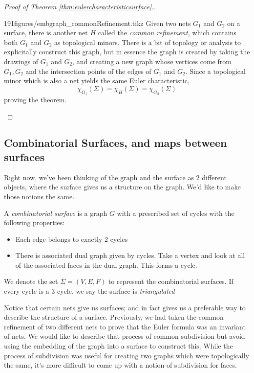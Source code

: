 \begin{proof}[Proof of Theorem \ref{thm:eulercharacteristicsurface}.]
\begin{paragraphfigureenv}{191figures/embgraph_commonRefinement.tikz}
Given two nets $G_1$ and $G_2$ on a surface, there is another net $H$ called the \emph{common refinement,} which contains both $G_1$ and $G_2$ as topological minors. There is a bit of topology or analysis to explicitally construct this graph, but in essence the graph is created by taking the drawings of $G_1$ and $G_2$, and creating a new graph whose vertices come from $G_1, G_2$ and the intersection points of the edges of $G_1$ and $G_2$. 
Since a topological minor which is also a net yields the same Euler characteristic,
\[\chi_{G_1}(\Sigma)=\chi_{H}(\Sigma)=\chi_{G_2}(\Sigma)\]
proving the theorem.
\end{paragraphfigureenv}

\end{proof}
\subsection{Combinatorial Surfaces, and maps between surfaces}
Right now, we've been thinking of the graph and the surface as 2 different objects, where the surface gives us a structure on the graph. We'd like to make those notions the same. 
\begin{definition}
 A \emph{combinatorial surface} is a graph $G$ with a prescribed set of cycles with the following properties: 
 \begin{itemize}
  \item Each edge belongs to exactly 2 cycles
  \item There is associated dual graph given by cycles. Take a vertex and look at all of the associated faces in the dual graph. This forms a cycle. 
 \end{itemize}
 We denote the set $\Sigma=(V, E, F)$ to represent the combinatorial surfaces.  If every cycle is a 3-cycle, we say the surface is \emph{triangulated}
\end{definition}
Notice that certain nets give us surfaces; and in fact gives us a preferable way to describe the structure of a surface. 
Previously, we had taken the common refinement of two different nets to prove that the Euler formula was an invariant of nets. We would like to describe that process of common subdivision but avoid using the embedding of the graph into a surface to construct this. 
While the process of subdivision was useful for creating two graphs which were topologically the same, it's more difficult to come up with a notion of subdivision for faces. 


